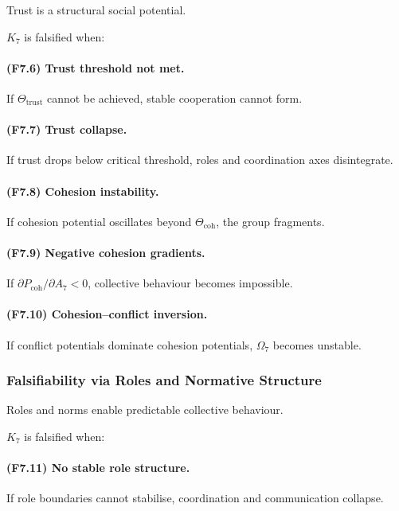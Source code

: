 Trust is a structural social potential.

$K_7$ is falsified when:

\paragraph{(F7.6) Trust threshold not met.}
If $\Theta_{\mathrm{trust}}$ cannot be achieved,
stable cooperation cannot form.

\paragraph{(F7.7) Trust collapse.}
If trust drops below critical threshold,
roles and coordination axes disintegrate.

\paragraph{(F7.8) Cohesion instability.}
If cohesion potential oscillates beyond $\Theta_{\mathrm{coh}}$,
the group fragments.

\paragraph{(F7.9) Negative cohesion gradients.}
If $\partial P_{\mathrm{coh}} / \partial A_7 < 0$,
collective behaviour becomes impossible.

\paragraph{(F7.10) Cohesion–conflict inversion.}
If conflict potentials dominate cohesion potentials,
$\Omega_7$ becomes unstable.



\subsubsection{Falsifiability via Roles and Normative Structure}

Roles and norms enable predictable collective behaviour.

$K_7$ is falsified when:

\paragraph{(F7.11) No stable role structure.}
If role boundaries cannot stabilise,
coordination and communication collapse.

